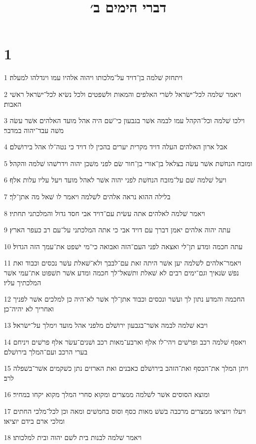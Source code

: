

\title{דברי הימים ב׳}


\chapter{1}

\par 1 ויתחזק שׁלמה בן־דויד על־מלכותו ויהוה אלהיו עמו ויגדלהו למעלה׃
\par 2 ויאמר שׁלמה לכל־ישׂראל לשׂרי האלפים והמאות ולשׁפטים ולכל נשׂיא לכל־ישׂראל ראשׁי האבות׃
\par 3 וילכו שׁלמה וכל־הקהל עמו לבמה אשׁר בגבעון כי־שׁם היה אהל מועד האלהים אשׁר עשׂה משׁה עבד־יהוה במדבר׃
\par 4 אבל ארון האלהים העלה דויד מקרית יערים בהכין לו דויד כי נטה־לו אהל בירושׁלם׃
\par 5 ומזבח הנחשׁת אשׁר עשׂה בצלאל בן־אורי בן־חור שׂם לפני משׁכן יהוה וידרשׁהו שׁלמה והקהל׃
\par 6 ויעל שׁלמה שׁם על־מזבח הנחשׁת לפני יהוה אשׁר לאהל מועד ויעל עליו עלות אלף׃
\par 7 בלילה ההוא נראה אלהים לשׁלמה ויאמר לו שׁאל מה אתן־לך׃
\par 8 ויאמר שׁלמה לאלהים אתה עשׂית עם־דויד אבי חסד גדול והמלכתני תחתיו׃
\par 9 עתה יהוה אלהים יאמן דברך עם דויד אבי כי אתה המלכתני על־עם רב כעפר הארץ׃
\par 10 עתה חכמה ומדע תן־לי ואצאה לפני העם־הזה ואבואה כי־מי ישׁפט את־עמך הזה הגדול׃
\par 11 ויאמר־אלהים לשׁלמה יען אשׁר היתה זאת עם־לבבך ולא־שׁאלת עשׁר נכסים וכבוד ואת נפשׁ שׂנאיך וגם־ימים רבים לא שׁאלת ותשׁאל־לך חכמה ומדע אשׁר תשׁפוט את־עמי אשׁר המלכתיך עליו׃
\par 12 החכמה והמדע נתון לך ועשׁר ונכסים וכבוד אתן־לך אשׁר לא־היה כן למלכים אשׁר לפניך ואחריך לא יהיה־כן׃
\par 13 ויבא שׁלמה לבמה אשׁר־בגבעון ירושׁלם מלפני אהל מועד וימלך על־ישׂראל׃
\par 14 ויאסף שׁלמה רכב ופרשׁים ויהי־לו אלף וארבע־מאות רכב ושׁנים־עשׂר אלף פרשׁים ויניחם בערי הרכב ועם־המלך בירושׁלם׃
\par 15 ויתן המלך את־הכסף ואת־הזהב בירושׁלם כאבנים ואת הארזים נתן כשׁקמים אשׁר־בשׁפלה לרב׃
\par 16 ומוצא הסוסים אשׁר לשׁלמה ממצרים ומקוא סחרי המלך מקוא יקחו במחיר׃
\par 17 ויעלו ויוציאו ממצרים מרכבה בשׁשׁ מאות כסף וסוס בחמשׁים ומאה וכן לכל־מלכי החתים ומלכי ארם בידם יוציאו׃
\par 18 ויאמר שׁלמה לבנות בית לשׁם יהוה ובית למלכותו׃


